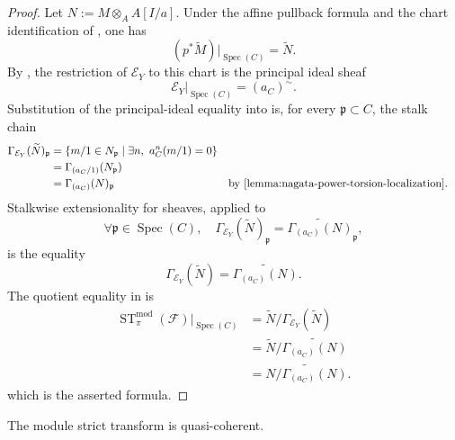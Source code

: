 \begin{proof}
  Let $N:=M\otimes_AA[I/a]$.  Under the affine pullback formula and the chart
  identification of
  , one has
  \[
    (p^*\widetilde M)|_{\operatorname{Spec}(C)}=\widetilde N.
  \]
  By , the restriction of
  $\mathcal E_Y$ to this chart is the principal ideal sheaf
  \[
    \mathcal E_Y|_{\operatorname{Spec}(C)}=(a_C)^{\sim}.
  \]
  Substitution of the principal-ideal equality into
   is, for every
  $\mathfrak p\subset C$, the stalk chain
  \[
  \begin{aligned}
    \Gamma_{\mathcal E_Y}(\widetilde N)_{\mathfrak p}
      &=\{m/1\in N_{\mathfrak p}\mid
           \exists n,\ a_C^n(m/1)=0\}\\
      &=\Gamma_{(a_C/1)}(N_{\mathfrak p})\\
      &=\Gamma_{(a_C)}(N)_{\mathfrak p}
        &&\text{by \Cref{lemma:nagata-power-torsion-localization}}.
  \end{aligned}
  \]
  Stalkwise extensionality for sheaves, applied to
  \[
    \forall\mathfrak p\in\operatorname{Spec}(C),\quad
    \Gamma_{\mathcal E_Y}(\widetilde N)_{\mathfrak p}
      =\widetilde{\Gamma_{(a_C)}(N)}_{\mathfrak p},
  \]
  is the equality
  \[
    \Gamma_{\mathcal E_Y}(\widetilde N)
      =\widetilde{\Gamma_{(a_C)}(N)}.
  \]
  The quotient equality in
   is
  \[
  \begin{aligned}
    \operatorname{ST}^{\mathrm{mod}}_\pi(\mathcal F)
      |_{\operatorname{Spec}(C)}
      &=\widetilde N\big/
        \Gamma_{\mathcal E_Y}(\widetilde N)\\
      &=\widetilde N\big/
        \widetilde{\Gamma_{(a_C)}(N)}\\
      &=\widetilde{N/\Gamma_{(a_C)}(N)}.
  \end{aligned}
  \]
  which is the asserted formula.
\end{proof}

\begin{lemma}
  \label{lemma:nagata-module-strict-transform-qc}
  \lean{}

  The module strict transform is quasi-coherent.
\end{lemma}

